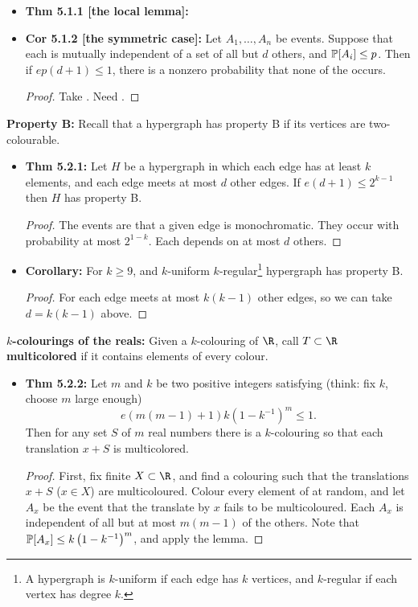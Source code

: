 \documentclass[11pt]{article}
\newenvironment{INT}[1][]{\begin{itemize}\small\item\textbf{#1}}{\end{itemize}}
\newcommand{\moreINT}[1][]{\item\textbf{#1}}
\begin{document}
\begin{chapter5}
\begin{itemise}
\begin{INT}[Thm 5.1.1 {[the local lemma]}:]
\moreINT[Cor 5.1.2 {[the symmetric case]}:]
Let $A_1,\ldots,A_n$ be events. Suppose that each is mutually independent of a set of all but $d$ others, and $\operatorname{\mathbb{P}}[A_i]\leq p$. Then if $ep(d+1)\leq 1$, there is a nonzero probability that none of the  occurs.
\begin{proof}
Take . Need .
\end{proof}
\end{INT}
\item \textbf{Property B:} Recall that a hypergraph has property B if its vertices are two-colourable.
\begin{INT}[Thm 5.2.1:]
Let $H$ be a hypergraph in which each edge has at least $k$ elements, and each edge meets at most $d$ other edges. If $e(d+1)\leq2^{k-1}$ then $H$ has property B.
\begin{proof}
The events are that a given edge is monochromatic. They occur with probability at most $2^{1-k}$. Each depends on at most $d$ others.
\end{proof}
\moreINT[Corollary:] For $k\geq9$, and $k$-uniform $k$-regular\footnote{A hypergraph is $k$-uniform if each edge has $k$ vertices, and $k$-regular if each vertex has degree $k$.} hypergraph has property B.
\begin{proof}
For each edge meets at most $k(k-1)$ other edges, so we can take $d=k(k-1)$ above.
\end{proof}
\end{INT}
\item \textbf{$k$-colourings of the reals:} Given a $k$-colouring of $\R$, call $T\subset\R$ \textbf{multicolored} if it contains elements of every colour.
\begin{INT}[Thm 5.2.2:]
Let $m$ and $k$ be two positive integers satisfying (think: fix $k$, choose $m$ large enough)
\[e(m(m-1)+1)k\left(1-k^{-1}\right)^m\leq1.\]
Then for any set $S$ of $m$ real numbers there is a $k$-colouring so that each translation $x+S$ is multicolored.
\begin{proof}
First, fix finite $X\subset\R$, and find a colouring such that the translations $x+S$ ($x\in X$) are multicoloured. Colour every element of  at random, and let $A_x$ be the event that the translate by $x$ fails to be multicoloured. Each $A_x$ is independent of all but at most $m(m-1)$ of the others. Note that $\operatorname{\mathbb{P}}[A_x]\leq k\left(1-k^{-1}\right)^m$, and apply the lemma.


\end{proof}
\end{INT}
\end{itemise}
\end{chapter5}
\end{document}
